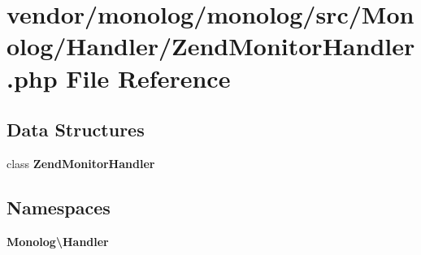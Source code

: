 \section{vendor/monolog/monolog/src/\+Monolog/\+Handler/\+Zend\+Monitor\+Handler.php File Reference}
\label{_zend_monitor_handler_8php}
\subsection*{Data Structures}
\begin{DoxyCompactItemize}
\item 
class {\bf Zend\+Monitor\+Handler}
\end{DoxyCompactItemize}
\subsection*{Namespaces}
\begin{DoxyCompactItemize}
\item 
 {\bf Monolog\textbackslash{}\+Handler}
\end{DoxyCompactItemize}
